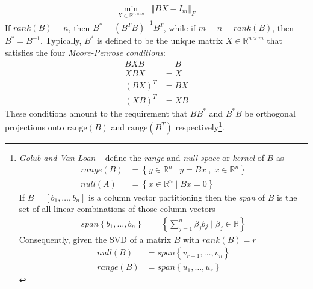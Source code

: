 \documentclass[a4paper,twoside,10pt,english]{report}
\begin{document}
\begin{align*}
\min_{X\in\mathbb{R}^{n\times m}} & \left\Vert BX-I_{m}\right\Vert _{F}
\end{align*}
If $rank\left(B\right)=n$, then $B^{*}=\left(B^{T}B\right)^{-1}B^{T}$,
while if $m=n=rank\left(B\right)$, then $B^{*}=B^{-1}$. Typically,
$B^{*}$ is defined to be the unique matrix $X\in\mathbb{R}^{n\times m}$
that satisfies the four \emph{Moore-Penrose conditions}:
\begin{align*}
BXB &= B\\
XBX &= X\\
\left(BX\right)^{T} &= BX\\
\left(XB\right)^{T} &= XB
\end{align*}
These conditions amount to the requirement that $BB^{*}$ and $B^{*}B$
be orthogonal projections onto $\text{range}\left(B\right)$ and 
$\text{range}\left(B^{T}\right)$ respectively\footnote{\emph{Golub and Van Loan} 
~\cite[Section 2.1.2]{GolubVanLoan_MatrixComputations}
define the \emph{range} and \emph{null space} or \emph{kernel} of $B$ as
\begin{align*}
range\left(B\right) &= \left\{ y\in\mathbb{R}^{n}\mid y=Bx\;,\; x\in\mathbb{R}^{n}\right\}\\
null\left(A\right) &= \left\{ x\in\mathbb{R}^{n}\mid Bx=0\right\} 
\end{align*}
If $B=\left[b_{1},\ldots,b_{n}\right]$ is a column vector partitioning
then the \emph{span} of $B$ is the set of all linear combinations
of those column vectors
\begin{align*}
span\left\{ b_{1},\ldots,b_{n}\right\}  &= \left\{ \sum_{j=1}^{n}\beta_{j}b_{j}\mid\beta_{j}\in\mathbb{R}\right\} 
\end{align*}
Consequently, given the SVD of a matrix $B$ with $rank\left(B\right)=r$
\begin{align*}
null\left(B\right) &= span\left\{ v_{r+1},\ldots,v_{n}\right\} \\
range\left(B\right) &= span\left\{ u_{1},\ldots,u_{r}\right\} 
\end{align*}

}.
\end{document}
